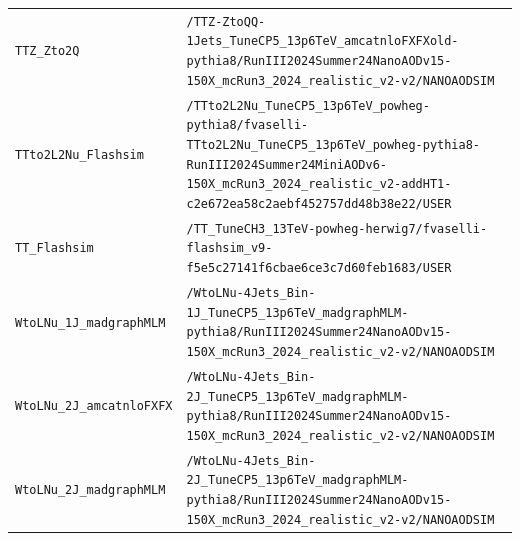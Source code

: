 \begin{longtable}{@{}>{\RaggedRight\arraybackslash}p{} >{\RaggedRight\arraybackslash}p{}@{}}
\addlinespace[2pt]
\texttt{TTZ\_\allowbreak{}Zto2Q} & \texttt{/\allowbreak{}TTZ-\allowbreak{}ZtoQQ-\allowbreak{}1Jets\_\allowbreak{}TuneCP5\_\allowbreak{}13p6TeV\_\allowbreak{}amcatnloFXFXold-\allowbreak{}pythia8/\allowbreak{}RunIII2024Summer24NanoAODv15-\allowbreak{}150X\_\allowbreak{}mcRun3\_\allowbreak{}2024\_\allowbreak{}realistic\_\allowbreak{}v2-\allowbreak{}v2/\allowbreak{}NANOAODSIM} \\
\addlinespace[2pt]
\texttt{TTto2L2Nu\_\allowbreak{}Flashsim} & \texttt{/\allowbreak{}TTto2L2Nu\_\allowbreak{}TuneCP5\_\allowbreak{}13p6TeV\_\allowbreak{}powheg-\allowbreak{}pythia8/\allowbreak{}fvaselli-\allowbreak{}TTto2L2Nu\_\allowbreak{}TuneCP5\_\allowbreak{}13p6TeV\_\allowbreak{}powheg-\allowbreak{}pythia8-\allowbreak{}RunIII2024Summer24MiniAODv6-\allowbreak{}150X\_\allowbreak{}mcRun3\_\allowbreak{}2024\_\allowbreak{}realistic\_\allowbreak{}v2-\allowbreak{}addHT1-\allowbreak{}c2e672ea58c2aebf452757dd48b38e22/\allowbreak{}USER} \\
\addlinespace[2pt]
\texttt{TT\_\allowbreak{}Flashsim} & \texttt{/\allowbreak{}TT\_\allowbreak{}TuneCH3\_\allowbreak{}13TeV-\allowbreak{}powheg-\allowbreak{}herwig7/\allowbreak{}fvaselli-\allowbreak{}flashsim\_\allowbreak{}v9-\allowbreak{}f5e5c27141f6cbae6ce3c7d60feb1683/\allowbreak{}USER} \\
\addlinespace[2pt]
\texttt{WtoLNu\_\allowbreak{}1J\_\allowbreak{}madgraphMLM} & \texttt{/\allowbreak{}WtoLNu-\allowbreak{}4Jets\_\allowbreak{}Bin-\allowbreak{}1J\_\allowbreak{}TuneCP5\_\allowbreak{}13p6TeV\_\allowbreak{}madgraphMLM-\allowbreak{}pythia8/\allowbreak{}RunIII2024Summer24NanoAODv15-\allowbreak{}150X\_\allowbreak{}mcRun3\_\allowbreak{}2024\_\allowbreak{}realistic\_\allowbreak{}v2-\allowbreak{}v2/\allowbreak{}NANOAODSIM} \\
\addlinespace[2pt]
\texttt{WtoLNu\_\allowbreak{}2J\_\allowbreak{}amcatnloFXFX} & \texttt{/\allowbreak{}WtoLNu-\allowbreak{}4Jets\_\allowbreak{}Bin-\allowbreak{}2J\_\allowbreak{}TuneCP5\_\allowbreak{}13p6TeV\_\allowbreak{}madgraphMLM-\allowbreak{}pythia8/\allowbreak{}RunIII2024Summer24NanoAODv15-\allowbreak{}150X\_\allowbreak{}mcRun3\_\allowbreak{}2024\_\allowbreak{}realistic\_\allowbreak{}v2-\allowbreak{}v2/\allowbreak{}NANOAODSIM} \\
\addlinespace[2pt]
\texttt{WtoLNu\_\allowbreak{}2J\_\allowbreak{}madgraphMLM} & \texttt{/\allowbreak{}WtoLNu-\allowbreak{}4Jets\_\allowbreak{}Bin-\allowbreak{}2J\_\allowbreak{}TuneCP5\_\allowbreak{}13p6TeV\_\allowbreak{}madgraphMLM-\allowbreak{}pythia8/\allowbreak{}RunIII2024Summer24NanoAODv15-\allowbreak{}150X\_\allowbreak{}mcRun3\_\allowbreak{}2024\_\allowbreak{}realistic\_\allowbreak{}v2-\allowbreak{}v2/\allowbreak{}NANOAODSIM} \\

\end{longtable}
